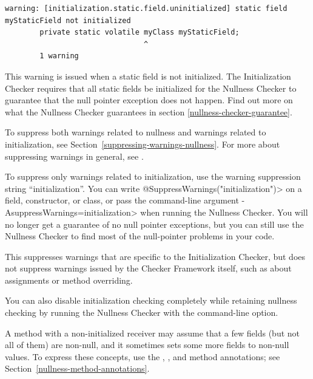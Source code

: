 \begin{verbatim}
warning: [initialization.static.field.uninitialized] static field myStaticField not initialized
        private static volatile myClass myStaticField;
                                ^
        1 warning
\end{verbatim}
This warning is issued when a static field is not initialized.  The Initialization Checker requires that all static fields be initialized for the Nullness Checker to guarantee that the null pointer exception does not happen.
Find out more on what the Nullness Checker guarantees in section \ref{nullness-checker-guarantee}.


To suppress both warnings related to nullness and warnings related to initialization,
see Section~\ref{suppressing-warnings-nullness}.
For more about suppressing warnings in general, see
.

To suppress only warnings related to initialization, use the
warning suppression string ``initialization''.
You can write \<@SuppressWarnings("initialization")>
on a field, constructor, or
class, or pass the command-line argument
\<-AsuppressWarnings=initialization> when
running the Nullness Checker.
You will no longer get a guarantee
of no null pointer exceptions, but you can still use the Nullness Checker
to find most of the null-pointer problems in your code.

This suppresses warnings that are specific to the Initialization Checker,
but does not suppress warnings issued by the Checker Framework itself, such
as about assignments or method overriding.

You can also disable initialization checking completely while retaining
nullness checking by running the Nullness Checker with the
 command-line option.




A method with a non-initialized receiver may assume that a few fields (but not all
of them) are non-null, and it sometimes sets some more fields to non-null
values.  To express these concepts, use the
,
, and
 method annotations;
see Section~\ref{nullness-method-annotations}.


